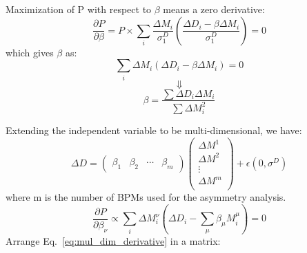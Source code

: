 Maximization of P with respect to $\beta$ means a zero derivative:
\begin{equation}
    \frac{\partial P}{\partial \beta} = P \times 
    \sum_i \frac{\Delta M_i}{\sigma_1^D} \left( \frac{\Delta D_i - \beta\Delta M_i}{\sigma_1^D}\right)
    = 0
\end{equation}
which gives $\beta$ as:
\begin{equation}
    \sum_i \Delta M_i (\Delta D_i - \beta\Delta M_i) = 0 
\end{equation}
$$ \Downarrow $$
\begin{equation}
    \beta = \frac{\sum \Delta D_i \Delta M_i}{\sum \Delta M^2_i}
\end{equation}

Extending the independent variable to be multi-dimensional, we have:
\begin{equation}
    \Delta D = \begin{pmatrix} \beta_1 & \beta_2 & \cdots & \beta_m \end{pmatrix} 
	\begin{pmatrix}
	    \Delta M^1	\\
	    \Delta M^2	\\
	    \vdots 	\\
	    \Delta M^m	\\
	\end{pmatrix}
	+ \epsilon(0, \sigma^D)
\end{equation}
where m is the number of BPMs used for the asymmetry analysis.
\begin{equation}
    \frac{\partial P}{\partial \beta_\nu} \propto \sum_i \Delta M_i^\nu (\Delta D_i - \sum_\mu \beta_\mu M_i^\mu) = 0
    \label{eq:mul_dim_derivative}
\end{equation}
Arrange Eq.~\ref{eq:mul_dim_derivative} in a matrix:
